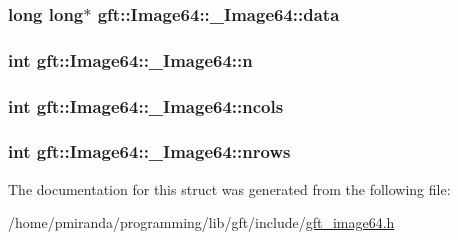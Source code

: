 \subsubsection[{\texorpdfstring{data}{data}}]{\setlength{\rightskip}{0pt plus 5cm}long long$\ast$ gft\+::\+Image64\+::\+\_\+\+Image64\+::data}\hypertarget{structgft_1_1Image64_1_1__Image64_a0c78dfc1f22f84c7c1dc854d0e33bbc0}{}\label{structgft_1_1Image64_1_1__Image64_a0c78dfc1f22f84c7c1dc854d0e33bbc0}
\subsubsection[{\texorpdfstring{n}{n}}]{\setlength{\rightskip}{0pt plus 5cm}int gft\+::\+Image64\+::\+\_\+\+Image64\+::n}\hypertarget{structgft_1_1Image64_1_1__Image64_a7fdc0d8158f088dc04bf35e3039d449f}{}\label{structgft_1_1Image64_1_1__Image64_a7fdc0d8158f088dc04bf35e3039d449f}
\subsubsection[{\texorpdfstring{ncols}{ncols}}]{\setlength{\rightskip}{0pt plus 5cm}int gft\+::\+Image64\+::\+\_\+\+Image64\+::ncols}\hypertarget{structgft_1_1Image64_1_1__Image64_a7425ad4e26726e6472acbe75e1ea9290}{}\label{structgft_1_1Image64_1_1__Image64_a7425ad4e26726e6472acbe75e1ea9290}
\subsubsection[{\texorpdfstring{nrows}{nrows}}]{\setlength{\rightskip}{0pt plus 5cm}int gft\+::\+Image64\+::\+\_\+\+Image64\+::nrows}\hypertarget{structgft_1_1Image64_1_1__Image64_a80d241238b4a992e8429517ab9725397}{}\label{structgft_1_1Image64_1_1__Image64_a80d241238b4a992e8429517ab9725397}


The documentation for this struct was generated from the following file\+:\begin{DoxyCompactItemize}
\item 
/home/pmiranda/programming/lib/gft/include/\hyperlink{gft__image64_8h}{gft\+\_\+image64.\+h}\end{DoxyCompactItemize}
